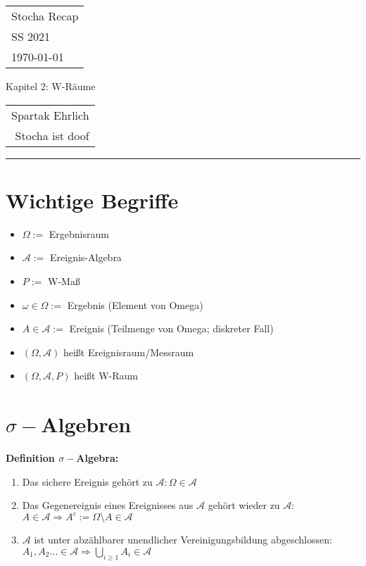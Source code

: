 \documentclass[a4paper,11pt]{scrartcl}
\begin{document}
{\raggedright
\begin{tabular}{l}
    Stocha Recap \\
    SS 2021 \\
    \today{}
\end{tabular}}
\hfill
{\Large Kapitel 2: W-Räume}
\hfill
\begin{tabular}{r}
    Spartak Ehrlich \\
    Stocha ist doof
\end{tabular}
\hrule

\section{Wichtige Begriffe}

\begin{itemize}
    \item $\Omega :=$ Ergebnisraum
    \item $\mathcal{A} :=$ Ereignis-Algebra
    \item $P :=$ W-Maß
    \item $\omega \in \Omega :=$ Ergebnis (Element von Omega)
    \item $A \in \mathcal{A} :=$ Ereignis (Teilmenge von Omega; diskreter Fall)
    \item $(\Omega,\mathcal{A})$ heißt Ereignisraum/Messraum
    \item $(\Omega,\mathcal{A},P)$ heißt W-Raum
\end{itemize}

\section{$\sigma-$Algebren}

\textbf{Definition $\sigma-$Algebra:}
\begin{enumerate}
    \item Das sichere Ereignis gehört zu $\mathcal{A}: \Omega \in \mathcal{A}$
    \item Das Gegenereignis eines Ereignisses aus $\mathcal{A}$ gehört wieder zu $\mathcal{A} :$ $A \in \mathcal{A} \Rightarrow A^c := \Omega \setminus A \in \mathcal{A}$
    \item $\mathcal{A}$ ist unter abzählbarer unendlicher Vereinigungsbildung  abgeschlossen: $A_1,A_2 \dots \in \mathcal{A} \Rightarrow \bigcup_{i \geq 1} A_i \in \mathcal{A}$
\end{enumerate}
\end{document}
